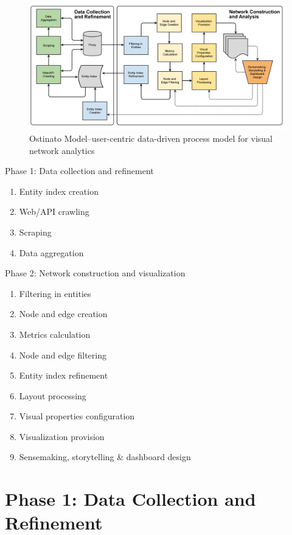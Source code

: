 \begin{figure}[htb]
\centering
\includegraphics[width=1.0\textwidth]{diagram/kredible_net_process_model-v07.png}
\caption{Ostinato Model--user-centric data-driven process model for visual network analytics}
\label{fig:ostinato}
\end{figure}

Phase 1: Data collection and refinement

\begin{enumerate}
\item Entity index creation
\item Web/API crawling
\item Scraping
\item Data aggregation
\end{enumerate}

Phase 2: Network construction and visualization

\begin{enumerate}
\item Filtering in entities 
\item Node and edge creation
\item Metrics calculation
\item Node and edge filtering
\item Entity index refinement
\item Layout processing
\item Visual properties configuration
\item Visualization provision
\item Sensemaking, storytelling \& dashboard design
\end{enumerate}

\section{Phase 1: Data Collection and Refinement}
\label{subsec:modelphase1}

